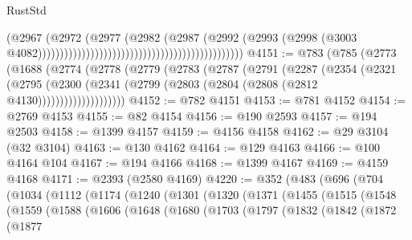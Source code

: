 \begin{lexlean}{RustStd}
\begin{coremodule}
                                                                                (@2967
                                                                                  (@2972
                                                                                    (@2977
                                                                                      (@2982
                                                                                        (@2987
                                                                                          (@2992
                                                                                            (@2993
                                                                                              (@2998
                                                                                                (@3003
                                                                                                  @4082)))))))))))))))))))))))))))))))))))))))))))))))
@4151 := @783
    (@785
      (@2773
        (@1688
          (@2774
            (@2778
              (@2779
                (@2783
                  (@2787
                    (@2791
                      (@2287
                        (@2354
                          (@2321
                            (@2795
                              (@2300
                                (@2341 (@2799 (@2803 (@2804 (@2808 (@2812 @4130))))))))))))))))))))
@4152 := @782 @4151
@4153 := @781 @4152
@4154 := @2769 @4153
@4155 := @82 @4154
@4156 := @190 @2593
@4157 := @194 @2503
@4158 := @1399 @4157
@4159 := @4156 @4158
@4162 := @29 @3104 (@32 @3104)
@4163 := @130 @4162
@4164 := @129 @4163
@4166 := @100 @4164 @104
@4167 := @194 @4166
@4168 := @1399 @4167
@4169 := @4159 @4168
@4171 := @2393 (@2580 @4169)
@4220 := @352
    (@483
      (@696
        (@704
          (@1034
            (@1112
              (@1174
                (@1240
                  (@1301
                    (@1320
                      (@1371
                        (@1455
                          (@1515
                            (@1548
                              (@1559
                                (@1588
                                  (@1606
                                    (@1648
                                      (@1680
                                        (@1703
                                          (@1797
                                            (@1832
                                              (@1842
                                                (@1872
                                                  (@1877

\end{coremodule}
\end{lexlean}
